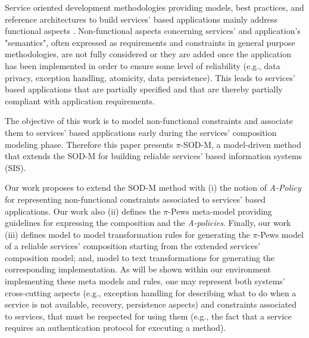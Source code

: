Service oriented development methodologies providing models, best practices, and reference architectures to build services' based applications mainly address  functional aspects \cite{1,2,decastro1,PapazoglouH06}.  Non-functional aspects concerning services' and application's "semantics", often expressed as requirements and constraints in general purpose methodologies, are not fully considered or they are added once the application has been implemented in order to ensure some level of reliability (e.g., data privacy, exception handling, atomicity, data persistence). This leads to services' based applications that are partially specified and that are thereby partially compliant with application requirements.

The objective of this work   is to model non-functional constraints and associate them to  services' based applications  early during the services' composition modeling phase. Therefore this paper presents $\pi$-SOD-M, a model-driven method  that extends the SOD-M  \cite{decastro1} for building reliable  services' based information systems (SIS). 

Our work proposes to extend the SOD-M \cite{decastro1} method with  (i)  the notion of {\em A-Policy} \cite{Espinosa-Oviedo2011a} for representing non-functional constraints associated to services' based applications.  
Our work  also (ii) defines the $\pi$-{\sc Pews}  meta-model \cite{Placido2010LTPD} providing guidelines for expressing the composition and the {\em A-policies}. Finally, our work (iii) defines model to model transformation rules for generating the $\pi$-{\sc Pews} model of a reliable services' composition starting from the extended services' composition model; and, model to text transformations for generating the corresponding implementation. As will be shown within our environment implementing these meta models and rules, one may represent both systems' cross-cutting aspects (e.g., exception handling for describing what to do when a service is not available, recovery, persistence aspects) and constraints associated to services, that must be respected for using them (e.g., the fact that a service requires an authentication protocol for executing a method). 

